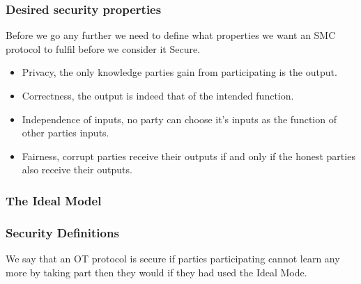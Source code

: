 \documentclass{beamer}
\begin{document}
	\begin{frame}
		\frametitle{Desired security properties}

		Before we go any further we need to define what properties we want an SMC protocol to fulfil before we consider it Secure.
		
		\begin{itemize}
			\item Privacy, the only knowledge parties gain from participating is the output.
			\item Correctness, the output is indeed that of the intended function.
			\item Independence of inputs, no party can choose it's inputs as the function of other parties inputs.
			\item Fairness, corrupt parties receive their outputs if and only if the honest parties also receive their outputs.
		\end{itemize}

	\end{frame}

	\begin{frame}
		\frametitle{The Ideal Model}
		
	\end{frame}

	\begin{frame}
		\frametitle{Security Definitions}
		We say that an OT protocol is secure if parties participating cannot learn any more by taking part then they would if they had used the Ideal Mode.
	\end{frame}
\end{document}
